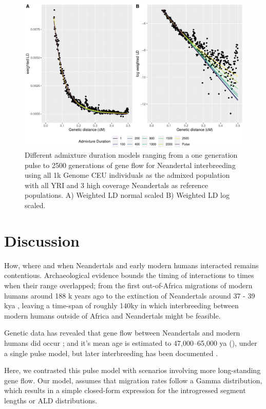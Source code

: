 \documentclass[]{article}
\begin{document}
\begin{figure}
\centering
\includegraphics{Admixture_Time_Inference_Paper_Draft_files/figure-latex/fig5-1.pdf}
\caption{\label{fig:fig5} Different admixture duration models ranging
from a one generation pulse to 2500 generations of gene flow for Neandertal interbreeding using all 1k Genome CEU individuals as the admixed population
with all YRI and 3 high coverage Neandertals as reference populations. A) Weighted LD normal scaled B) Weighted LD log scaled.}
\end{figure}

\section{Discussion}\label{discussion}

How, where and when Neandertals and early modern humans interacted remains contentious.  
Archaeological evidence bounds the timing of interactions to times when their range overlapped; from the first out-of-Africa migrations of modern humans around 188 k years ago \citep{stringer_when_2018,hershkovitz_earliest_2018} to the extinction of Neandertals around 37 - 39 kya \citep{higham_timing_2014,zilhao_precise_2017}, leaving a time-span of roughly 140ky in which interbreeding between modern humans outside of Africa and Neandertals might be feasible.

Genetic data has revealed that gene flow between Neandertals and modern humans did occur \citep{green_draft_2010}; and it's mean age is estimated to 47,000–65,000 ya (\citep{sankararaman_date_2012}), under a single pulse model, but later interbreeding has been documented \citep{fu_early_2015}.

Here, we contrasted this pulse model with scenarios involving more long-standing gene flow.  Our model, assumes that migration rates  follow a Gamma distribution, which results in a simple closed-form expression for the introgressed segment lengths or ALD  distributions. 
\end{document}
